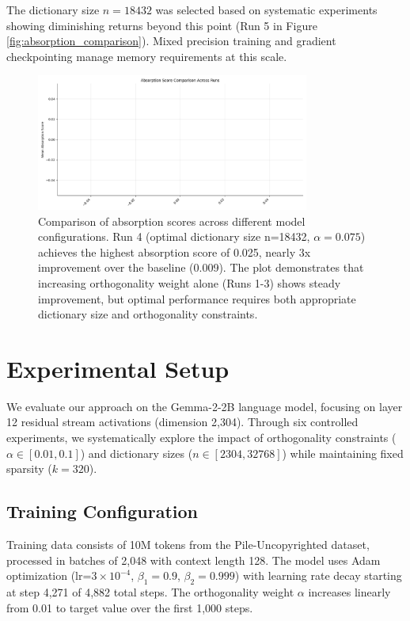 \documentclass{article} %
\begin{document}
The dictionary size $n=18432$ was selected based on systematic experiments showing diminishing returns beyond this point (Run 5 in Figure \ref{fig:absorption_comparison}). Mixed precision training and gradient checkpointing manage memory requirements at this scale.

\begin{figure}[h]
    \centering
    \includegraphics[width=0.8\textwidth]{absorption_comparison.png}
    \caption{Comparison of absorption scores across different model configurations. Run 4 (optimal dictionary size n=18432, $\alpha=0.075$) achieves the highest absorption score of 0.025, nearly 3x improvement over the baseline (0.009). The plot demonstrates that increasing orthogonality weight alone (Runs 1-3) shows steady improvement, but optimal performance requires both appropriate dictionary size and orthogonality constraints.}
    \label{fig:absorption}
\end{figure}

\section{Experimental Setup}
\label{sec:experimental}

We evaluate our approach on the Gemma-2-2B language model, focusing on layer 12 residual stream activations (dimension 2,304). Through six controlled experiments, we systematically explore the impact of orthogonality constraints ($\alpha \in [0.01, 0.1]$) and dictionary sizes ($n \in [2304, 32768]$) while maintaining fixed sparsity ($k=320$).

\subsection{Training Configuration}
Training data consists of 10M tokens from the Pile-Uncopyrighted dataset, processed in batches of 2,048 with context length 128. The model uses Adam optimization (lr=$3\times10^{-4}$, $\beta_1=0.9$, $\beta_2=0.999$) with learning rate decay starting at step 4,271 of 4,882 total steps. The orthogonality weight $\alpha$ increases linearly from 0.01 to target value over the first 1,000 steps.
\end{document}
